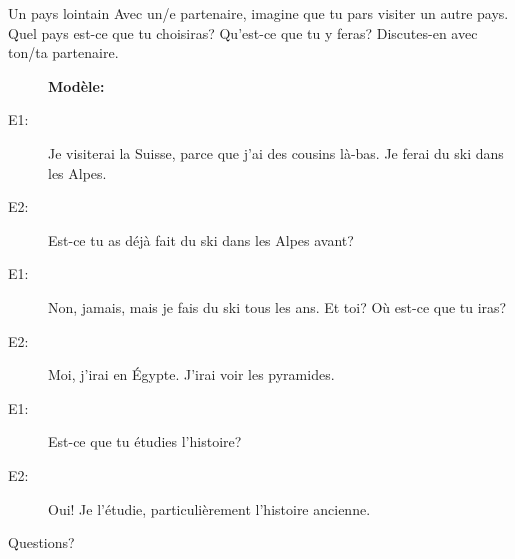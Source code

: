 \documentclass{beamer}
\begin{document}
  \begin{frame}{Un pays lointain}
    Avec un/e partenaire, imagine que tu pars visiter un autre pays.
    Quel pays est-ce que tu choisiras?
    Qu'est-ce que tu y feras?
    Discutes-en avec ton/ta partenaire.
    \begin{description}
      \item[] \textbf{Modèle:}
      \item[E1:] Je visiterai la Suisse, \alert{parce que} j'ai des cousins là-bas. Je ferai du ski dans les Alpes.
      \item[E2:] Est-ce tu as déjà fait du ski dans les Alpes avant?
      \item[E1:] Non, jamais, mais je fais du ski tous les ans. Et toi? Où est-ce que tu iras?
      \item[E2:] Moi, j'irai en Égypte. J'irai voir les pyramides.
      \item[E1:] Est-ce que tu étudies l'histoire?
      \item[E2:] Oui! Je l'étudie, particulièrement l'histoire ancienne.
    \end{description}
  \end{frame}

  \begin{frame}{}
    \begin{center}
      \Large Questions?
    \end{center}
  \end{frame}
\end{document}
